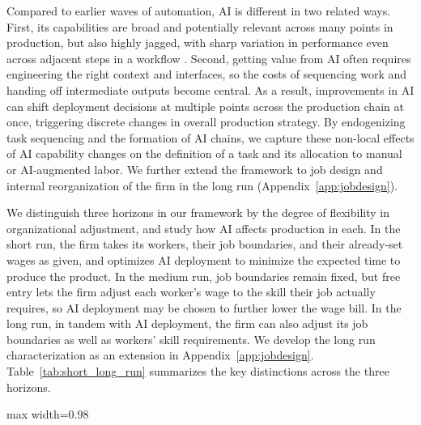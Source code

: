 Compared to earlier waves of automation, AI is different in two related ways. 
First, its capabilities are broad and potentially relevant across many points in production, but also highly jagged, with sharp variation in performance even across adjacent steps in a workflow \citep{dell2023navigating}. 
Second, getting value from AI often requires engineering the right context and interfaces, so the costs of sequencing work and handing off intermediate outputs become central. 
As a result, improvements in AI can shift deployment decisions at multiple points across the production chain at once, triggering discrete changes in overall production strategy. 
By endogenizing task sequencing and the formation of AI chains, we capture these non-local effects of AI capability changes on the definition of a task and its allocation to manual or AI-augmented labor. 
We further extend the framework to job design and internal reorganization of the firm in the long run (Appendix~\ref{app:jobdesign}).

We distinguish three horizons in our framework by the degree of flexibility in organizational adjustment, and study how AI affects production in each.
In the short run, the firm takes its workers, their job boundaries, and their already-set wages as given, and optimizes AI deployment to minimize the expected time to produce the product.
In the medium run, job boundaries remain fixed, but free entry lets the firm adjust each worker's wage to the skill their job actually requires, so AI deployment may be chosen to further lower the wage bill.
In the long run, in tandem with AI deployment, the firm can also adjust its job boundaries as well as workers' skill requirements. 
We develop the long run characterization as an extension in Appendix~\ref{app:jobdesign}.
Table~\ref{tab:short_long_run} summarizes the key distinctions across the three horizons.
\begin{table}[htbp]
    \centering
    \vspace{0.1cm}
    \caption{Summary of AI's Impact in the Short, Medium, and Long Run}
    \label{tab:short_long_run}
    \begin{adjustbox}{max width=0.98\textwidth}
    
    \end{adjustbox}
\end{table}


